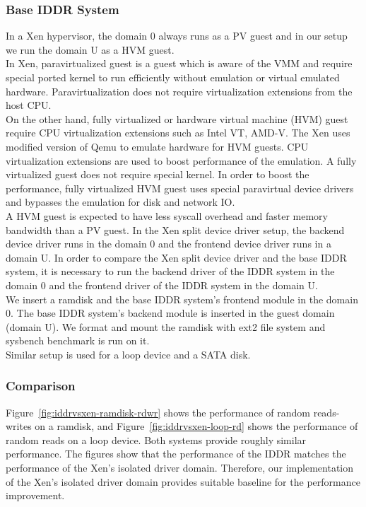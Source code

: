 \subsubsection*{Base IDDR System}
In a Xen hypervisor, the domain 0 always runs as a PV guest and in our setup we run the domain U as a HVM guest.
\\[3mm] 
In Xen, paravirtualized guest is a guest which is aware of the VMM and require special ported kernel to run efficiently without emulation or virtual emulated hardware. Paravirtualization does not require virtualization extensions from the host CPU. 
\\[3mm]
On the other hand, fully virtualized or hardware virtual machine (HVM) guest require CPU virtualization extensions such as Intel VT, AMD-V. The Xen uses modified version of Qemu to emulate hardware for HVM guests. CPU virtualization extensions are used to boost performance of the emulation. A fully virtualized guest does not require special kernel. In order to boost the performance, fully virtualized HVM guest uses special paravirtual device drivers and bypasses the emulation for disk and network IO.
\\[3mm]
A HVM guest is expected to have less syscall overhead and faster memory bandwidth than a PV guest. In the Xen split device driver setup, the backend device driver runs in the domain 0 and the frontend device driver runs in a domain U. In order to compare the Xen split device driver and the base IDDR system, it is necessary to run the backend driver of the IDDR system in the domain 0 and the frontend driver of the IDDR system in the domain U.
\\[3mm]
We insert a ramdisk and the base IDDR system's frontend module in the domain 0. The base IDDR system's backend module is inserted in the guest domain (domain U). We format and mount the ramdisk with ext2 file system and sysbench benchmark is run on it.  
\\[3mm]
Similar setup is used for a loop device and a SATA disk.
\subsubsection*{Comparison}
Figure~\ref{fig:iddrvsxen-ramdisk-rdwr} shows the performance of random reads-writes on a ramdisk, and Figure~\ref{fig:iddrvsxen-loop-rd} shows the performance of random reads on a loop device. Both systems provide roughly similar performance. The figures show that the performance of the IDDR matches the performance of the Xen's isolated driver domain. Therefore, our implementation of the Xen's isolated driver domain provides suitable baseline for the performance improvement.


